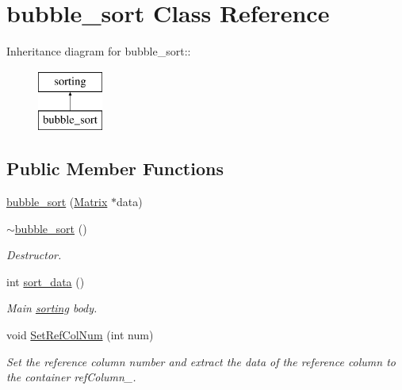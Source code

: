 \hypertarget{classbubble__sort}{
\section{bubble\_\-sort Class Reference}
\label{dc/d2f/classbubble__sort}
}
Inheritance diagram for bubble\_\-sort::\begin{figure}[H]
\begin{center}
\leavevmode
\includegraphics[height=2cm]{dc/d2f/classbubble__sort}
\end{center}
\end{figure}
\subsection*{Public Member Functions}
\begin{DoxyCompactItemize}
\item 
\hyperlink{classbubble__sort_aa413fc87fd7b9a0da354c0da0bfc0fa2}{bubble\_\-sort} (\hyperlink{classMatrix}{Matrix} $\ast$data)
\item 
\hypertarget{classbubble__sort_ad33134a9337963c4a3e39397bdd5d09d}{
\hyperlink{classbubble__sort_ad33134a9337963c4a3e39397bdd5d09d}{$\sim$bubble\_\-sort} ()}
\label{dc/d2f/classbubble__sort_ad33134a9337963c4a3e39397bdd5d09d}

\begin{DoxyCompactList}\small\item\em Destructor. \item\end{DoxyCompactList}\item 
int \hyperlink{classbubble__sort_a8fdc845adc8e24bbb169b79ef5140ee2}{sort\_\-data} ()
\begin{DoxyCompactList}\small\item\em Main \hyperlink{classsorting}{sorting} body. \item\end{DoxyCompactList}\item 
\hypertarget{classbubble__sort_af950c87cd047c9d26b12cba8e06e6326}{
void \hyperlink{classbubble__sort_af950c87cd047c9d26b12cba8e06e6326}{SetRefColNum} (int num)}
\label{dc/d2f/classbubble__sort_af950c87cd047c9d26b12cba8e06e6326}

\begin{DoxyCompactList}\small\item\em Set the reference column number and extract the data of the reference column to the container refColumn\_\-. \item\end{DoxyCompactList}\end{DoxyCompactItemize}


